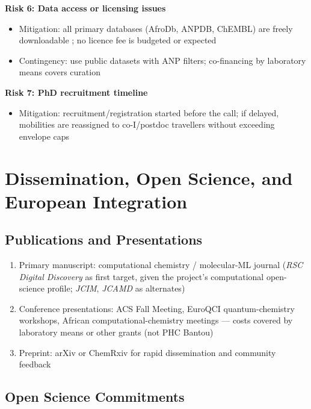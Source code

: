 \documentclass[11pt,a4paper]{article}
\begin{document}
\textbf{Risk 6: Data access or licensing issues}
\begin{itemize}
    \item Mitigation: all primary databases (AfroDb, ANPDB, ChEMBL) are freely downloadable \cite{ntiekang2013,mendez2019}; no licence fee is budgeted or expected
    \item Contingency: use public datasets with ANP filters; co-financing by laboratory means covers curation
\end{itemize}

\textbf{Risk 7: PhD recruitment timeline}
\begin{itemize}
    \item Mitigation: recruitment/registration started before the call; if delayed, mobilities are reassigned to co-I/postdoc travellers without exceeding envelope caps
\end{itemize}

\section{Dissemination, Open Science, and European Integration}
\label{sec:europe}

\subsection{Publications and Presentations}

\begin{enumerate}
    \item Primary manuscript: computational chemistry / molecular-ML journal (\textit{RSC Digital Discovery} as first target, given the project's computational open-science profile; \textit{JCIM}, \textit{JCAMD} as alternates)
    \item Conference presentations: ACS Fall Meeting, EuroQCI quantum-chemistry workshops, African computational-chemistry meetings --- costs covered by laboratory means or other grants (not PHC Bantou)
    \item Preprint: arXiv or ChemRxiv for rapid dissemination and community feedback
\end{enumerate}

\subsection{Open Science Commitments}
\end{document}
